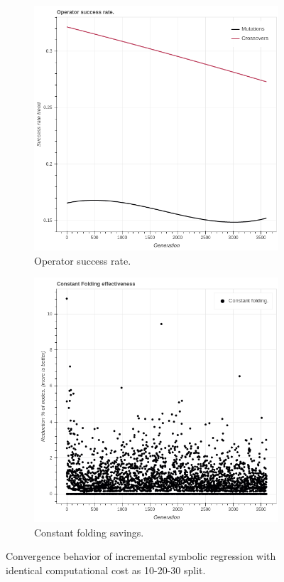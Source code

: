 \begin{figure}
\begin{subfigure}{0.5\textwidth}
        \includegraphics[width=0.8\linewidth]{figures/incrementaloperatorsuccessrate30d.png}
        \caption{Operator success rate.}
    \end{subfigure}
    \begin{subfigure}{0.5\textwidth}
        \includegraphics[width=0.8\linewidth]{figures/incrementalconstfolding30d.png}
        \caption{Constant folding savings.}
    \end{subfigure}
    \caption{Convergence behavior of incremental symbolic regression with identical computational cost as 10-20-30 split.}
    \label{fig:incrementaldoubleconvergence}
\end{figure}
